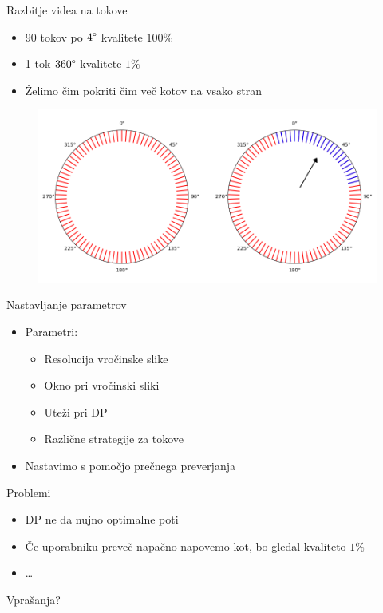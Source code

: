 \begin{frame}{Razbitje videa na tokove}
  \begin{itemize}
    \item 90 tokov po $4\degree$ kvalitete $100\%$
    \item 1 tok $360\degree$ kvalitete $1\%$
    \item Želimo čim pokriti čim več kotov na vsako stran
  \end{itemize}
  \begin{figure}
    \includegraphics[scale=0.4]{img/streams.png}
  \end{figure}
\end{frame}

\begin{frame}{Nastavljanje parametrov}
  \begin{itemize}
    \item Parametri:
    \begin{itemize}
      \item Resolucija vročinske slike
      \item Okno pri vročinski sliki
      \item Uteži pri DP
      \item Različne strategije za tokove
    \end{itemize}
    \item Nastavimo s pomočjo prečnega preverjanja
  \end{itemize}
\end{frame}

\begin{frame}{Problemi}
  \begin{itemize}
    \item DP ne da nujno optimalne poti
    \item Če uporabniku preveč napačno napovemo kot, bo gledal kvaliteto $1\%$
    \item \ldots
  \end{itemize}
\end{frame}

\begin{frame}{}
  \centering
  \huge{Vprašanja?}
\end{frame}
